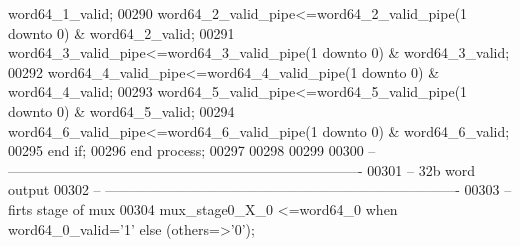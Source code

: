 \begin{DoxyCode}
{      word64_1_valid};
00290             \textcolor{vhdlchar}{word64_2_valid_pipe}\textcolor{vhdlchar}{<=}\textcolor{vhdlchar}{word64_2_valid_pipe}\textcolor{vhdlchar}{(}\textcolor{vhdllogic}{}\textcolor{vhdllogic}{1} \textcolor{keywordflow}{downto} \textcolor{vhdllogic}{}\textcolor{vhdllogic}{0}\textcolor{vhdlchar}{)} \textcolor{vhdlchar}{&} \textcolor{vhdlchar}{
      word64_2_valid};
00291             \textcolor{vhdlchar}{word64_3_valid_pipe}\textcolor{vhdlchar}{<=}\textcolor{vhdlchar}{word64_3_valid_pipe}\textcolor{vhdlchar}{(}\textcolor{vhdllogic}{}\textcolor{vhdllogic}{1} \textcolor{keywordflow}{downto} \textcolor{vhdllogic}{}\textcolor{vhdllogic}{0}\textcolor{vhdlchar}{)} \textcolor{vhdlchar}{&} \textcolor{vhdlchar}{
      word64_3_valid};
00292             \textcolor{vhdlchar}{word64_4_valid_pipe}\textcolor{vhdlchar}{<=}\textcolor{vhdlchar}{word64_4_valid_pipe}\textcolor{vhdlchar}{(}\textcolor{vhdllogic}{}\textcolor{vhdllogic}{1} \textcolor{keywordflow}{downto} \textcolor{vhdllogic}{}\textcolor{vhdllogic}{0}\textcolor{vhdlchar}{)} \textcolor{vhdlchar}{&} \textcolor{vhdlchar}{
      word64_4_valid};
00293             \textcolor{vhdlchar}{word64_5_valid_pipe}\textcolor{vhdlchar}{<=}\textcolor{vhdlchar}{word64_5_valid_pipe}\textcolor{vhdlchar}{(}\textcolor{vhdllogic}{}\textcolor{vhdllogic}{1} \textcolor{keywordflow}{downto} \textcolor{vhdllogic}{}\textcolor{vhdllogic}{0}\textcolor{vhdlchar}{)} \textcolor{vhdlchar}{&} \textcolor{vhdlchar}{
      word64_5_valid};
00294             \textcolor{vhdlchar}{word64_6_valid_pipe}\textcolor{vhdlchar}{<=}\textcolor{vhdlchar}{word64_6_valid_pipe}\textcolor{vhdlchar}{(}\textcolor{vhdllogic}{}\textcolor{vhdllogic}{1} \textcolor{keywordflow}{downto} \textcolor{vhdllogic}{}\textcolor{vhdllogic}{0}\textcolor{vhdlchar}{)} \textcolor{vhdlchar}{&} \textcolor{vhdlchar}{
      word64_6_valid};
00295         \textcolor{keywordflow}{end} \textcolor{keywordflow}{if};
00296     \textcolor{keywordflow}{end} \textcolor{keywordflow}{process};   
00297 
00298      
00299 
00300 \textcolor{keyword}{-- ----------------------------------------------------------------------------}
00301 \textcolor{keyword}{-- 32b word output}
00302 \textcolor{keyword}{-- ----------------------------------------------------------------------------}
00303 \textcolor{keyword}{--firts stage of mux}
00304 \textcolor{vhdlchar}{mux_stage0_X_0}  \textcolor{vhdlchar}{<=}\textcolor{vhdlchar}{word64_0} \textcolor{keywordflow}{when} \textcolor{vhdlchar}{word64_0_valid}\textcolor{vhdlchar}{=}\textcolor{vhdlchar}{'}\textcolor{vhdllogic}{}\textcolor{vhdllogic}{1}\textcolor{vhdlchar}{'} \textcolor{keywordflow}{else} \textcolor{vhdlchar}{(}\textcolor{keywordflow}{others}\textcolor{vhdlchar}{=}\textcolor{vhdlchar}{>}\textcolor{vhdlchar}{'}\textcolor{vhdllogic}{}\textcolor{vhdllogic}{0}\textcolor{vhdlchar}{'}\textcolor{vhdlchar}{)};

\end{DoxyCode}
